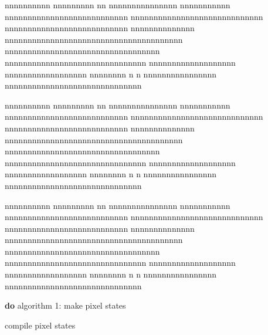 \documentclass[]{elsarticle} %
\begin{document}
nnnnnnnnnn nnnnnnnnn nn nnnnnnnnnnnnnnn nnnnnnnnnnn nnnnnnnnnnnnnnnnnnnnnnnnnnn nnnnnnnnnnnnnnnnnnnnnnnnnnnnn nnnnnnnnnnnnnnnnnnnnnnnnnnn nnnnnnnnnnnnnn nnnnnnnnnnnnnnnnnnnnnnnnnnnnnnnnnnnnnnn nnnnnnnnnnnnnnnnnnnnnnnnnnnnnnnnnn nnnnnnnnnnnnnnnnnnnnnnnnnnnnnnn nnnnnnnnnnnnnnnnnnn nnnnnnnnnnnnnnnnnn nnnnnnnn n n nnnnnnnnnnnnnnnn nnnnnnnnnnnnnnnnnnnnnnnnnnnnnn

nnnnnnnnnn nnnnnnnnn nn nnnnnnnnnnnnnnn nnnnnnnnnnn nnnnnnnnnnnnnnnnnnnnnnnnnnn nnnnnnnnnnnnnnnnnnnnnnnnnnnnn nnnnnnnnnnnnnnnnnnnnnnnnnnn nnnnnnnnnnnnnn nnnnnnnnnnnnnnnnnnnnnnnnnnnnnnnnnnnnnnn nnnnnnnnnnnnnnnnnnnnnnnnnnnnnnnnnn nnnnnnnnnnnnnnnnnnnnnnnnnnnnnnn nnnnnnnnnnnnnnnnnnn nnnnnnnnnnnnnnnnnn nnnnnnnn n n nnnnnnnnnnnnnnnn nnnnnnnnnnnnnnnnnnnnnnnnnnnnnn

nnnnnnnnnn nnnnnnnnn nn nnnnnnnnnnnnnnn nnnnnnnnnnn nnnnnnnnnnnnnnnnnnnnnnnnnnn nnnnnnnnnnnnnnnnnnnnnnnnnnnnn nnnnnnnnnnnnnnnnnnnnnnnnnnn nnnnnnnnnnnnnn nnnnnnnnnnnnnnnnnnnnnnnnnnnnnnnnnnnnnnn nnnnnnnnnnnnnnnnnnnnnnnnnnnnnnnnnn nnnnnnnnnnnnnnnnnnnnnnnnnnnnnnn nnnnnnnnnnnnnnnnnnn nnnnnnnnnnnnnnnnnn nnnnnnnn n n nnnnnnnnnnnnnnnn nnnnnnnnnnnnnnnnnnnnnnnnnnnnnn

\begin{algorithm}[H]
\DontPrintSemicolon
\SetAlgoLined
{}
\BlankLine
\textbf{do} algorithm 1: make pixel states\ \label{lst:line:s1}\;
\caption{compile pixel states}
\end{algorithm}
\end{document}
